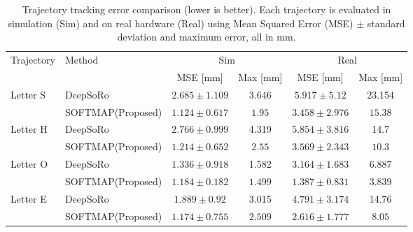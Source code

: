 \documentclass[letterpaper, 10 pt, conference]{ieeeconf}  %
\newcommand{\algname}{SOFTMAP\xspace}
\begin{document}
\begin{table}[t]
\centering
\caption{Trajectory tracking error comparison (lower is better). Each trajectory is evaluated in simulation (Sim) and on real hardware (Real) using Mean Squared Error (MSE) $\pm$ standard deviation and maximum error, all in mm.}
\small
\setlength{\tabcolsep}{6pt}
\renewcommand{\arraystretch}{1}
\begin{tabular}{l l cc cc}
\toprule
\multirow{2}{*}{Trajectory} &
\multirow{2}{*}{Method} &
\multicolumn{2}{c}{Sim} &
\multicolumn{2}{c}{Real} \\
\cmidrule(lr){3-4}\cmidrule(lr){5-6}
& & MSE [mm]  & Max [mm] & MSE [mm]  & Max [mm] \\
\midrule
\multirow{2}{*}{Letter S}
& DeepSoRo        & $2.685\pm1.109$   & 3.646  & $5.917\pm5.12$  & 23.154 \\
& \algname (Proposed) & $\mathbf{1.124\pm0.617}$ & $\mathbf{1.95}$  & $\mathbf{3.458\pm2.976}$ & $\mathbf{15.38}$ \\
\midrule
\multirow{2}{*}{Letter H}
& DeepSoRo        & $2.766\pm0.999$   & 4.319  & $5.854\pm3.816$ & 14.7 \\
& \algname (Proposed) & $\mathbf{1.214\pm0.652}$  & $\mathbf{2.55}$ & $\mathbf{3.569\pm2.343}$ & $\mathbf{10.3}$ \\
\midrule
\multirow{2}{*}{Letter O}
& DeepSoRo        & $1.336\pm0.918$   & 1.582  & $3.164\pm1.683$ & 6.887 \\
& \algname (Proposed) & $\mathbf{1.184\pm0.182}$ & $\mathbf{1.499}$ & $\mathbf{1.387\pm0.831}$ & $\mathbf{3.839}$ \\
\midrule
\multirow{2}{*}{Letter E}
& DeepSoRo        & $1.889\pm0.92$    & 3.015  & $4.791\pm3.174$ & 14.76 \\
& \algname (Proposed) & $\mathbf{1.174\pm0.755}$ & $\mathbf{2.509}$  & $\mathbf{2.616\pm1.777}$ & $\mathbf{8.05}$ \\
\bottomrule
\end{tabular}
\label{tab:traj_compare}
\vspace{-1.5em}
\end{table}
\end{document}
